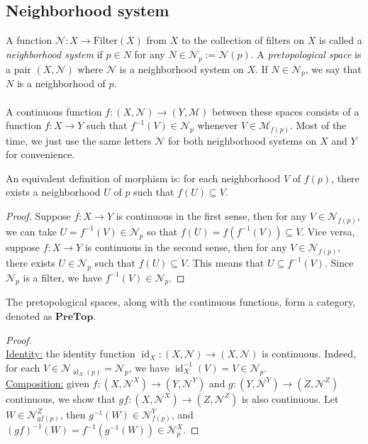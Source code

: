 \documentclass{treatise}
\begin{document}
\begin{shaded}
\subsection{Neighborhood system}
A function $\mathcal{N}: X \to \mathrm{Filter}(X)$ from $X$ to the collection of filters on $X$ is called a \emph{neighborhood system} if $p \in N$ for any $N \in \mathcal{N}_p := \mathcal{N}(p)$. A \emph{pretopological space} is a pair $(X, \mathcal{N})$ where $\mathcal{N}$ is a neighborhood system on $X$. If $N \in \mathcal{N}_p$, we say that $N$ is a neighborhood of $p$.
\\
\\
A continuous function $f: (X, \mathcal{N}) \to (Y, \mathcal{M})$ between these spaces consists of a function $f: X \to Y$ such that $f^{-1}(V) \in \mathcal{N}_p$ whenever $V \in \mathcal{M}_{f(p)}$. Most of the time, we just use the same letters $\mathcal{N}$ for both neighborhood systems on $X$ and $Y$ for convenience. 
\begin{remark}
An equivalent definition of morphism is: for each neighborhood $V$ of $f(p)$, there exists a neighborhood $U$ of $p$ such that $f(U) \subseteq V$.
\end{remark}
\begin{proof}
Suppose $f: X \to Y$ is continuous in the first sense, then for any $V \in \mathcal{N}_{f(p)}$, we can take $U = f^{-1}(V) \in \mathcal{N}_p$ so that $f(U) = f(f^{-1}(V)) \subseteq V$. Vice versa, suppose $f: X \to Y$ is continuous in the second sense, then for any $V \in \mathcal{N}_{f(p)}$, there exists $U \in \mathcal{N}_p$ such that $f(U) \subseteq V$. This means that $U \subseteq f^{-1}(V)$. Since $\mathcal{N}_p$ is a filter, we have $f^{-1}(V) \in \mathcal{N}_p$.
\end{proof}
\begin{proposition}
The pretopological spaces, along with the continuous functions, form a category, denoted as $\mathbf{PreTop}$.
\end{proposition}
\begin{proof} \ \\
\underline{Identity:} the identity function $\operatorname{id}_X : (X, \mathcal{N}) \to (X, \mathcal{N})$ is continuous. Indeed, for each $V \in \mathcal{N}_{\operatorname{id}_X(p)} = \mathcal{N}_p$, we have $\operatorname{id}_X^{-1}(V) = V \in \mathcal{N}_p$.
\\
\underline{Composition:} given $f: (X, \mathcal{N}^X) \to (Y, \mathcal{N}^Y)$ and $g: (Y, \mathcal{N}^Y) \to (Z, \mathcal{N}^Z)$ continuous, we show that $gf: (X, \mathcal{N}^X) \to (Z, \mathcal{N}^Z)$ is also continuous. Let $W \in \mathcal{N}^Z_{gf(p)}$, then $g^{-1}(W) \in \mathcal{N}^Y_{f(p)}$, and $(gf)^{-1}(W) = f^{-1}(g^{-1}(W)) \in \mathcal{N}^X_p$.

\end{proof}
\end{shaded}
\end{document}
